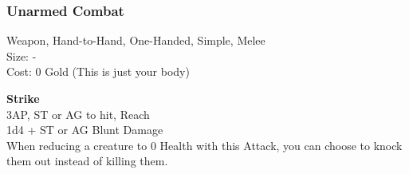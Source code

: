 \subsubsection{Unarmed Combat}\label{weapon:unarmedCombat}
Weapon, Hand-to-Hand, One-Handed, Simple, Melee\\
Size: -\\
Cost: 0 Gold (This is just your body)

\textbf{Strike}\\
3AP, ST or AG to hit,  Reach\\
1d4 +  ST or AG Blunt Damage\\
When reducing a creature to 0 Health with this Attack, you can choose to knock them out instead of killing them.
